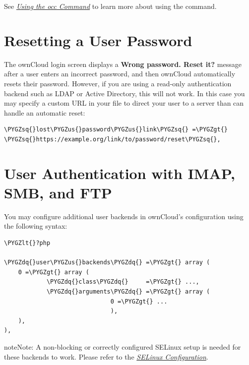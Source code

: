 \documentclass[letterpaper,10pt,english]{sphinxmanual}
\def\PYGZus{\char`\_}
\def\PYGZlt{\char`\<}
\def\PYGZgt{\char`\>}
\def\PYGZsq{\char`\'}
\def\PYGZdq{\char`\"}
\renewcommand\PYGZsq{\textquotesingle}
\begin{document}
See {\hyperref[configuration_server/occ_command::doc]{\emph{\emph{Using the occ Command}}}} to learn more about using the
 command.


\section{Resetting a User Password}
\label{configuration_user/reset_user_password:resetting-a-user-password}\label{configuration_user/reset_user_password::doc}
The ownCloud login screen displays a \textbf{Wrong password. Reset it?} message
after a user enters an incorrect password, and then ownCloud automatically
resets their password. However, if you are using a read-only authentication
backend such as LDAP or Active Directory, this will not work. In this case you
may specify a custom URL in your  file to direct your user to a
server than can handle an automatic reset:

\begin{Verbatim}[commandchars=\\\{\}]
\PYGZsq{}lost\PYGZus{}password\PYGZus{}link\PYGZsq{} =\PYGZgt{} \PYGZsq{}https://example.org/link/to/password/reset\PYGZsq{},
\end{Verbatim}


\section{User Authentication with IMAP, SMB, and FTP}
\label{configuration_user/user_auth_ftp_smb_imap:user-authentication-with-imap-smb-and-ftp}\label{configuration_user/user_auth_ftp_smb_imap::doc}
You may configure additional user backends
in ownCloud's configuration  using the following
syntax:

\begin{Verbatim}[commandchars=\\\{\}]
\PYGZlt{}?php

\PYGZdq{}user\PYGZus{}backends\PYGZdq{} =\PYGZgt{} array (
    0 =\PYGZgt{} array (
            \PYGZdq{}class\PYGZdq{}     =\PYGZgt{} ...,
            \PYGZdq{}arguments\PYGZdq{} =\PYGZgt{} array (
                              0 =\PYGZgt{} ...
                              ),
    ),
),
\end{Verbatim}

\begin{notice}{note}{Note:}
A non-blocking or correctly configured SELinux setup is needed
for these backends to work. Please refer to the {\hyperref[installation/selinux_configuration:selinux\string-config\string-label]{\emph{SELinux Configuration}}}.
\end{notice}
\end{document}
